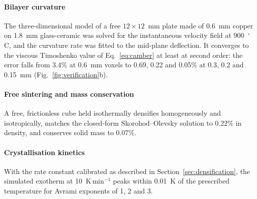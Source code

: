 \paragraph{Bilayer curvature} The three-dimensional model of a free $12\times12$~mm plate made of 0.6~mm copper on 1.8~mm glass-ceramic was solved for the instantaneous velocity field at 900~$^\circ$C, and the curvature rate was fitted to the mid-plane deflection. It converges to the viscous Timoshenko value of Eq.~\eqref{eq:camber} at least at second order: the error falls from 3.4\% at 0.6~mm voxels to 0.69, 0.22 and 0.05\% at 0.3, 0.2 and 0.15~mm (Fig.~\ref{fig:verification}b).

\paragraph{Free sintering and mass conservation} A free, frictionless cube held isothermally densifies homogeneously and isotropically, matches the closed-form Skorohod--Olevsky solution to 0.22\% in density, and conserves solid mass to 0.07\%.

\paragraph{Crystallisation kinetics} With the rate constant calibrated as described in Section~\ref{sec:densification}, the simulated exotherm at 10~K\,min$^{-1}$ peaks within 0.01~K of the prescribed temperature for Avrami exponents of 1, 2 and 3.
